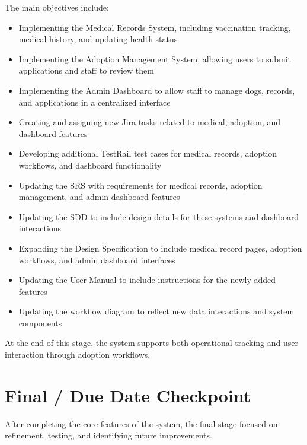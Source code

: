 \documentclass{article}
\begin{document}
The main objectives include:
\begin{itemize}
\item Implementing the Medical Records System, including vaccination tracking, medical history, and updating health status
\item Implementing the Adoption Management System, allowing users to submit applications and staff to review them
\item Implementing the Admin Dashboard to allow staff to manage dogs, records, and applications in a centralized interface
\item Creating and assigning new Jira tasks related to medical, adoption, and dashboard features
\item Developing additional TestRail test cases for medical records, adoption workflows, and dashboard functionality
\item Updating the SRS with requirements for medical records, adoption management, and admin dashboard features
\item Updating the SDD to include design details for these systems and dashboard interactions
\item Expanding the Design Specification to include medical record pages, adoption workflows, and admin dashboard interfaces
\item Updating the User Manual to include instructions for the newly added features
\item Updating the workflow diagram to reflect new data interactions and system components
\end{itemize}

\vspace{2mm}

\noindent At the end of this stage, the system supports both operational tracking and user interaction through adoption workflows.

\vspace{3mm}

\section*{Final / Due Date Checkpoint}

After completing the core features of the system, the final stage focused on refinement, testing, and identifying future improvements.\\
\end{document}
